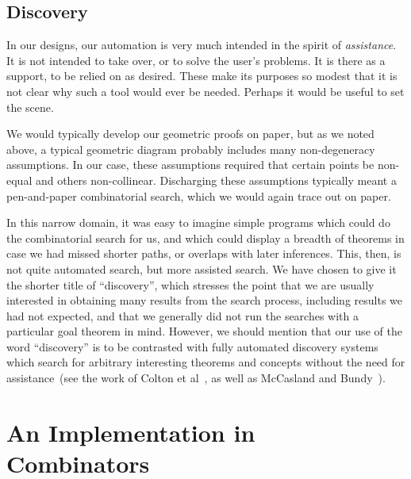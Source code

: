 
\subsection{Discovery}
In our designs, our automation is very much intended in the spirit of \emph{assistance}. It is not intended to take over, or to solve the user's problems. It is there as a support, to be relied on as desired. These make its purposes so modest that it is not clear why such a tool would ever be needed. Perhaps it would be useful to set the scene.

We would typically develop our geometric proofs on paper, but as we noted above, a typical geometric diagram probably includes many non-degeneracy assumptions. In our case, these assumptions required that certain points be non-equal and others non-collinear. Discharging these assumptions typically meant a pen-and-paper combinatorial search, which we would again trace out on paper.

In this narrow domain, it was easy to imagine simple programs which could do the combinatorial search for us, and which could display a breadth of theorems in case we had missed shorter paths, or overlaps with later inferences. This, then, is not quite automated search, but more assisted search. We have chosen to give it the shorter title of ``discovery'', which stresses the point that we are usually interested in obtaining many results from the search process, including results we had not expected, and that we generally did not run the searches with a particular goal theorem in mind. However, we should mention that our use of the word ``discovery'' is to be contrasted with fully automated discovery systems which search for arbitrary interesting theorems and concepts without the need for assistance~(see the work of Colton et al~\cite{MathematicalDiscovery,ColtonInterestingness}, as well as McCasland and Bundy~\cite{Mathsaid}).

\section{An Implementation in Combinators}\label{sec:DiscoveryAlgebra}
